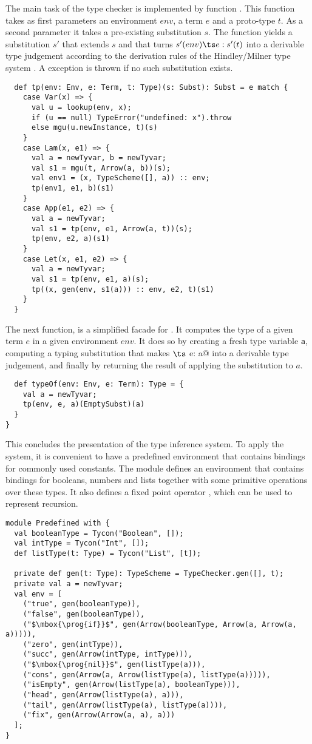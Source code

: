 \documentclass[11pt]{report}
\begin{document}
The main task of the type checker is implemented by function
\verb@tp@. This function takes as first parameters an environment $env$, a
term $e$ and a proto-type $t$. As a second parameter it takes a
pre-existing substitution $s$.  The function yields a substitution
$s'$ that extends $s$ and that
turns $s'(env) \ts e: s'(t)$ into a derivable type judgement according
to the derivation rules of the Hindley/Milner type system \cite{hindley-milner}.  A
\verb@TypeError@ exception is thrown if no such substitution exists.
\begin{verbatim}
  def tp(env: Env, e: Term, t: Type)(s: Subst): Subst = e match {
    case Var(x) => {
      val u = lookup(env, x);
      if (u == null) TypeError("undefined: x").throw
      else mgu(u.newInstance, t)(s)
    }
    case Lam(x, e1) => {
      val a = newTyvar, b = newTyvar;
      val s1 = mgu(t, Arrow(a, b))(s);
      val env1 = (x, TypeScheme([], a)) :: env;
      tp(env1, e1, b)(s1)
    }
    case App(e1, e2) => {
      val a = newTyvar;
      val s1 = tp(env, e1, Arrow(a, t))(s);
      tp(env, e2, a)(s1)
    }
    case Let(x, e1, e2) => {
      val a = newTyvar;
      val s1 = tp(env, e1, a)(s);
      tp((x, gen(env, s1(a))) :: env, e2, t)(s1)
    }
  }
\end{verbatim}
The next function, \verb@typeOf@ is a simplified facade for
\verb@tp@. It computes the type of a given term $e$ in a given
environment $env$. It does so by creating a fresh type variable \verb$a$,
computing a typing substitution that makes \verb@env $\ts$ e: a@ into
a derivable type judgement, and finally by returning the result of
applying the substitution to $a$.
\begin{verbatim}
  def typeOf(env: Env, e: Term): Type = {
    val a = newTyvar;
    tp(env, e, a)(EmptySubst)(a)
  }
}
\end{verbatim}
This concludes the presentation of the type inference system.
To apply the system, it is convenient to have a predefined environment
that contains bindings for commonly used constants. The module
\verb@Predefined@ defines an environment \verb@env@ that contains
bindings for booleans, numbers and lists together with some primitive
operations over these types. It also defines a fixed point operator
\verb@fix@, which can be used to represent recursion.
\begin{verbatim}
module Predefined with {
  val booleanType = Tycon("Boolean", []);
  val intType = Tycon("Int", []);
  def listType(t: Type) = Tycon("List", [t]);

  private def gen(t: Type): TypeScheme = TypeChecker.gen([], t);
  private val a = newTyvar;
  val env = [
    ("true", gen(booleanType)),
    ("false", gen(booleanType)),
    ("$\mbox{\prog{if}}$", gen(Arrow(booleanType, Arrow(a, Arrow(a, a))))),
    ("zero", gen(intType)),
    ("succ", gen(Arrow(intType, intType))),
    ("$\mbox{\prog{nil}}$", gen(listType(a))),
    ("cons", gen(Arrow(a, Arrow(listType(a), listType(a))))),
    ("isEmpty", gen(Arrow(listType(a), booleanType))),
    ("head", gen(Arrow(listType(a), a))),
    ("tail", gen(Arrow(listType(a), listType(a)))),
    ("fix", gen(Arrow(Arrow(a, a), a)))
  ];
}
\end{verbatim}
\end{document}
